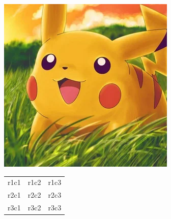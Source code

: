 \documentclass{article}
\begin{document}
\includegraphics{img} \\
\begin{tabular}{ c c c }
  r1c1 & r1c2 & r1c3 \\
  r2c1 & r2c2 & r2c3 \\
  r3c1 & r3c2 & r3c3
\end{tabular}
\end{document}
